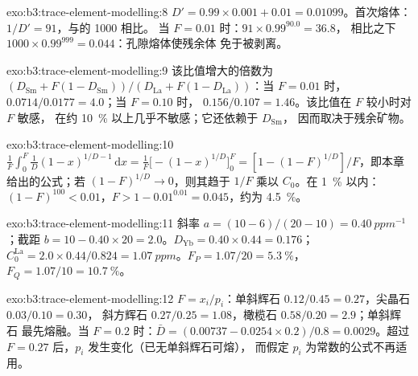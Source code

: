\begin{solution}{exo:b3:trace-element-modelling:8}
$D' = 0.99\times0.001 + 0.01 = 0.01099$。首次熔体：$1/D' = 91$，与的 1000 相比。
当 $F = 0.01$ 时：$91\times0.99^{90.0} = 36.8$，
相比之下 $1000\times0.99^{999} = 0.044$：孔隙熔体使残余体
免于被剥离。
\end{solution}

\begin{solution}{exo:b3:trace-element-modelling:9}
该比值增大的倍数为 $(D_{\mathrm{Sm}} + F(1 - D_{\mathrm{Sm}}))/(D_{\mathrm{La}}
+ F(1 - D_{\mathrm{La}}))$：当 $F = 0.01$ 时，$0.0714/0.0177 = 4.0$；当 $F = 0.10$ 时，
$0.156/0.107 = 1.46$。该比值在 $F$ 较小时对 $F$ 敏感，
在约 \qty{10}{\percent} 以上几乎不敏感；它还依赖于 $D_{\mathrm{Sm}}$，
因而取决于残余矿物。
\end{solution}

\begin{solution}{exo:b3:trace-element-modelling:10}
$\frac1F\int_0^F \frac1D(1 - x)^{1/D - 1}\,\mathrm dx = \frac1F\bigl[-(1 -
x)^{1/D}\bigr]_0^F = [1 - (1 - F)^{1/D}]/F$，即本章给出的公式；若
$(1 - F)^{1/D} \to 0$，则其趋于 $1/F$ 乘以 $C_0$。在 \qty{1}{\percent} 以内：
$(1 - F)^{100} < 0.01$，$F > 1 - 0.01^{0.01} = 0.045$，约为
\qty{4.5}{\percent}。
\end{solution}

\begin{solution}{exo:b3:trace-element-modelling:11}
斜率 $a = (10 - 6)/(20 - 10) = \qty{0.40}{ppm^{-1}}$；截距 $b = 10 -
0.40\times20 = 2.0$。$D_{\mathrm{Yb}} = 0.40\times0.44 = 0.176$；
$C_0^{\mathrm{La}} = 2.0\times0.44/0.824 = \qty{1.07}{ppm}$。$F_P = 1.07/20 =
\qty{5.3}{\percent}$，$F_Q = 1.07/10 = \qty{10.7}{\percent}$。
\end{solution}

\begin{solution}{exo:b3:trace-element-modelling:12}
$F = x_i/p_i$：单斜辉石 $0.12/0.45 = 0.27$，尖晶石 $0.03/0.10 = 0.30$，
斜方辉石 $0.27/0.25 = 1.08$，橄榄石 $0.58/0.20 = 2.9$；单斜辉石
最先熔融。当 $F = 0.2$ 时：$\bar D = (0.00737 - 0.0254\times0.2)/0.8 =
0.0029$。超过 $F = 0.27$ 后，$p_i$ 发生变化（已无单斜辉石可熔），
而假定 $p_i$ 为常数的公式不再适用。
\end{solution}

